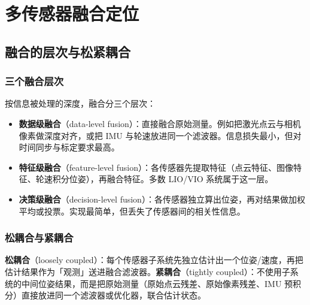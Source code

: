 ﻿\chapter{多传感器融合定位}\label{ch:09-fusion}


\section{融合的层次与松紧耦合}\label{sec:09-levels}

\subsection{三个融合层次}

按信息被处理的深度，融合分三个层次：

\begin{itemize}
  \item \textbf{数据级融合}（data-level fusion）：直接融合原始测量。例如把激光点云与相机像素做深度对齐，或把 IMU 与轮速放进同一个滤波器。信息损失最小，但对时间同步与标定要求最高。
  \item \textbf{特征级融合}（feature-level fusion）：各传感器先提取特征（点云特征、图像特征、轮速积分位姿），再融合特征。多数 LIO/VIO 系统属于这一层。
  \item \textbf{决策级融合}（decision-level fusion）：各传感器独立算出位姿，再对结果做加权平均或投票。实现最简单，但丢失了传感器间的相关性信息。
\end{itemize}

\subsection{松耦合与紧耦合}

\begin{definition}[松耦合与紧耦合]
\textbf{松耦合}（loosely coupled）：每个传感器子系统先独立估计出一个位姿/速度，再把估计结果作为「观测」送进融合滤波器。\textbf{紧耦合}（tightly coupled）：不使用子系统的中间位姿结果，而是把原始测量（原始点云残差、原始像素残差、IMU 预积分）直接放进同一个滤波器或优化器，联合估计状态。
\end{definition}

